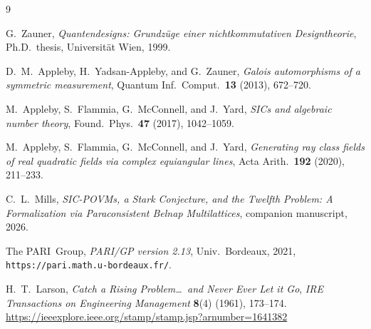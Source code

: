 \documentclass[12pt,a4paper]{article}
\begin{document}
\begin{thebibliography}{9}

G.\ Zauner, \emph{Quantendesigns: Grundz\"uge einer nichtkommutativen
Designtheorie}, Ph.D.\ thesis, Universit\"at Wien, 1999.

D.\ M.\ Appleby, H.\ Yadsan-Appleby, and G.\ Zauner,
\emph{Galois automorphisms of a symmetric measurement},
Quantum Inf.\ Comput.\ \textbf{13} (2013), 672--720.

M.\ Appleby, S.\ Flammia, G.\ McConnell, and J.\ Yard,
\emph{SICs and algebraic number theory},
Found.\ Phys.\ \textbf{47} (2017), 1042--1059.

M.\ Appleby, S.\ Flammia, G.\ McConnell, and J.\ Yard,
\emph{Generating ray class fields of real quadratic fields via complex
equiangular lines}, Acta Arith.\ \textbf{192} (2020), 211--233.

C.\ L.\ Mills, \emph{SIC-POVMs, a Stark Conjecture, and the Twelfth Problem:
A Formalization via Paraconsistent Belnap Multilattices}, companion
manuscript, 2026.

The PARI~Group, \emph{PARI/GP version 2.13}, Univ.\ Bordeaux, 2021,
\texttt{https://pari.math.u-bordeaux.fr/}.

H.\ T.\ Larson,
\textit{Catch a Rising Problem\ldots\ and Never Ever Let it Go},
\emph{IRE Transactions on Engineering Management} \textbf{8}(4) (1961), 173--174.
\url{https://ieeexplore.ieee.org/stamp/stamp.jsp?arnumber=1641382}

\end{thebibliography}
\end{document}
